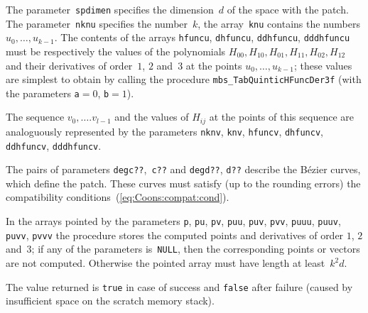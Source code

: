 The parameter~\texttt{spdimen} specifies the dimension~$d$ of the space with
the patch. The parameter~\texttt{nknu} specifies the number~$k$, the
array~\texttt{knu} contains the numbers $u_0,\ldots,u_{k-1}$. The contents
of the arrays \texttt{hfuncu}, \texttt{dhfuncu}, \texttt{ddhfuncu},
\texttt{dddhfuncu} must be respectively the values of the polynomials
$H_{00},H_{10},H_{01},H_{11},H_{02},H_{12}$
and their derivatives of order~$1$, $2$ and~$3$ at the points
$u_0,\ldots,u_{k-1}$; these values are simplest to obtain by calling
the procedure \texttt{mbs\_TabQuinticHFuncDer3f}
(with the parameters \texttt{a}${}=0$, \texttt{b}${}=1$).

The sequence $v_0,\ldots.v_{l-1}$ and the values of $H_{ij}$ at the points
of this sequence are analoguously represented by the parameters
\texttt{nknv}, \texttt{knv}, \texttt{hfuncv}, \texttt{dhfuncv},
\texttt{ddhfuncv}, \texttt{dddhfuncv}.

The pairs of parameters \texttt{degc??},~\texttt{c??} and \texttt{degd??},
\texttt{d??} describe the B\'{e}zier curves, which define the patch.
These curves must satisfy (up to the rounding errors)
the compatibility conditions~(\ref{eq:Coons:compat:cond}).

In the arrays pointed by the parameters \texttt{p}, \texttt{pu}, \texttt{pv},
\texttt{puu}, \texttt{puv}, \texttt{pvv}, \texttt{puuu}, \texttt{puuv},
\texttt{puvv}, \texttt{pvvv} the procedure stores the computed
points and derivatives of order $1$, $2$ and~$3$; if any of the parameters
is~\texttt{NULL}, then the corresponding points or vectors are not computed.
Otherwise the pointed array must have length at least~$k^2d$.

The value returned is \texttt{true} in case of success and \texttt{false}
after failure (caused by insufficient space on the scratch memory stack).


